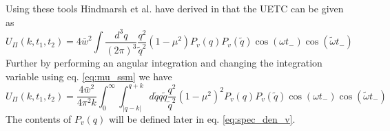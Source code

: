 Using these tools Hindmarsh et al. have derived in \cite{hindmarsh_gw_pt_2019} that the UETC can be given as
\cite[eq. 3.32]{hindmarsh_gw_pt_2019}
\begin{equation}
U_\Pi(k, t_1, t_2) = 4 \bar{w}^2 \int \frac{d^3 q}{(2\pi)^3} \frac{q^2}{\tilde{q}^2} (1 - \mu^2) P_v(q) P_v(\tilde{q}) \cos (\omega t_-) \cos (\tilde{\omega} t_-)
\end{equation}
Further by performing an angular integration and changing the integration variable using eq. \eqref{eq:mu_ssm} we have
\cite[eq. 3.34]{hindmarsh_gw_pt_2019}
\begin{equation}
U_\Pi (k, t_1, t_2) = \frac{4 \bar{w}^2}{4 \pi^2 k} \int_0^\infty \int_{|q-k|}^{q+k} d\tilde{q} q \tilde{q}
\frac{q^2}{\tilde{q}^2} (1-\mu^2)^2
P_v(q) P_v(\tilde{q})
\cos (\omega t_-) \cos (\tilde{\omega} t_-)
\label{eq:uetc_final}
\end{equation}
The contents of $P_v(q)$ will be defined later in eq. \eqref{eq:spec_den_v}.


